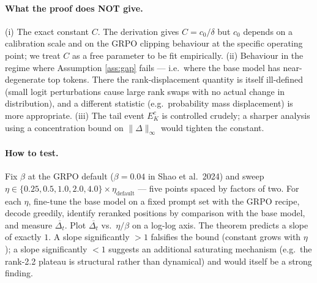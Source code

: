 \documentclass[11pt]{article}
\begin{document}
\paragraph{What the proof does NOT give.} (i) The exact constant $C$.
The derivation gives $C = c_0 / \delta$ but $c_0$ depends on a
calibration scale and on the GRPO clipping behaviour at the specific
operating point; we treat $C$ as a free parameter to be fit
empirically. (ii) Behaviour in the regime where Assumption
\ref{ass:gap} fails — i.e.\ where the base model has near-degenerate
top tokens. There the rank-displacement quantity is itself ill-defined
(small logit perturbations cause large rank swaps with no actual change
in distribution), and a different statistic (e.g.\ probability mass
displacement) is more appropriate. (iii) The tail event $E_K^c$ is
controlled crudely; a sharper analysis using a concentration bound on
$\|\Delta\|_\infty$ would tighten the constant.

\paragraph{How to test.} Fix $\beta$ at the GRPO default
($\beta = 0.04$ in Shao et al.\ 2024) and sweep $\eta \in \{0.25, 0.5,
1.0, 2.0, 4.0\} \times \eta_{\text{default}}$ — five points spaced by
factors of two. For each $\eta$, fine-tune the base model on a fixed
prompt set with the GRPO recipe, decode greedily, identify reranked
positions by comparison with the base model, and measure
$\overline{\Delta_t}$. Plot $\overline{\Delta_t}$ vs.\ $\eta / \beta$
on a log-log axis. The theorem predicts a slope of exactly $1$. A
slope significantly $> 1$ falsifies the bound (constant grows with
$\eta$); a slope significantly $< 1$ suggests an additional saturating
mechanism (e.g.\ the rank-2.2 plateau is structural rather than
dynamical) and would itself be a strong finding.
\end{document}
